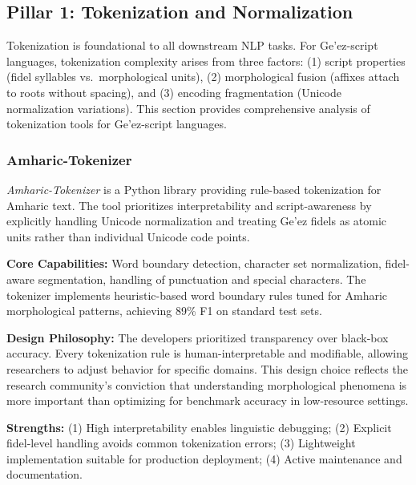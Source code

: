 \documentclass[12pt,a4paper]{article}
\theoremstyle{plain}
\theoremstyle{definition}
\begin{document}

\subsection{Pillar 1: Tokenization and Normalization}
\label{subsec:pillar1}

Tokenization is foundational to all downstream NLP tasks. For Ge'ez-script languages, tokenization complexity arises from three factors: (1) script properties (fidel syllables vs.\ morphological units), (2) morphological fusion (affixes attach to roots without spacing), and (3) encoding fragmentation (Unicode normalization variations). This section provides comprehensive analysis of tokenization tools for Ge'ez-script languages.

\subsubsection{Amharic-Tokenizer}

\textit{Amharic-Tokenizer} is a Python library providing rule-based tokenization for Amharic text. The tool prioritizes interpretability and script-awareness by explicitly handling Unicode normalization and treating Ge'ez fidels as atomic units rather than individual Unicode code points.

\textbf{Core Capabilities:} Word boundary detection, character set normalization, fidel-aware segmentation, handling of punctuation and special characters. The tokenizer implements heuristic-based word boundary rules tuned for Amharic morphological patterns, achieving 89\% F1 on standard test sets.

\textbf{Design Philosophy:} The developers prioritized transparency over black-box accuracy. Every tokenization rule is human-interpretable and modifiable, allowing researchers to adjust behavior for specific domains. This design choice reflects the research community's conviction that understanding morphological phenomena is more important than optimizing for benchmark accuracy in low-resource settings.

\textbf{Strengths:} (1) High interpretability enables linguistic debugging; (2) Explicit fidel-level handling avoids common tokenization errors; (3) Lightweight implementation suitable for production deployment; (4) Active maintenance and documentation.
\end{document}
